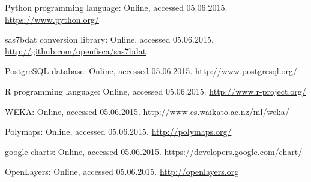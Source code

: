 \documentclass[12pt]{aghdpl}
\begin{document}
\begin{thebibliography}{99}
Python programming language: Online, accessed 05.06.2015. \href{https://www.python.org/}{https://www.python.org/}

sas7bdat conversion library: Online, accessed 05.06.2015. \href{http://github.com/openfisca/sas7bdat}{http://github.com/openfisca/sas7bdat}

PostgreSQL database: Online, accessed 05.06.2015. \href{http://www.postgresql.org/}{http://www.postgresql.org/}

R programming language: Online, accessed 05.06.2015. \href{http://www.r-project.org/}{http://www.r-project.org/}

WEKA: Online, accessed 05.06.2015. \href{http://www.cs.waikato.ac.nz/ml/weka/}{http://www.cs.waikato.ac.nz/ml/weka/}

Polymaps: Online, accessed 05.06.2015. \href{http://polymaps.org/}{http://polymaps.org/}

google charts: Online, accessed 05.06.2015. \href{https://developers.google.com/chart/}{https://developers.google.com/chart/}

OpenLayers: Online, accessed 05.06.2015. \href{http://openlayers.org}{http://openlayers.org}


\end{thebibliography}
\end{document}
